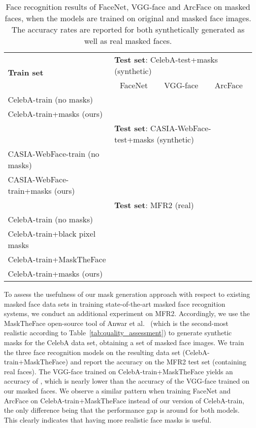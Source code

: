 \documentclass{article}
\begin{document}
\begin{table}
\begin{center}
\setlength\tabcolsep{4.5pt}
\begin{tabular}{|l|c|c|c|}
    \hline
    \multirow{2}{*}{\bf Train set} & \multicolumn{3}{|l|}{{\bf Test set}: CelebA-test+masks (synthetic)} \\
\cline{2-4}
    & FaceNet & VGG-face & ArcFace\\
    \hline
    \hline
    CelebA-train (no masks) &  &  & \\
    \hline
    CelebA-train+masks (ours)  &  &  & \\
    \hline
     & \multicolumn{3}{|l|}{{\bf Test set}: CASIA-WebFace-test+masks (synthetic)} \\
     \hline
    CASIA-WebFace-train (no masks) &  &  & \\
    \hline
    CASIA-WebFace-train+masks (ours)  &  &  & \\
    \hline
    & \multicolumn{3}{|l|}{{\bf Test set}: MFR2 (real)} \\
     \hline
     CelebA-train (no masks) &  &  & \\
     \hline
    CelebA-train+black pixel masks  &  &  & \\
    \hline
    CelebA-train+MaskTheFace \cite{anwar2020arxiv}  &  &  & \\
    \hline
    CelebA-train+masks (ours)  &  &  & \\
    \hline
\end{tabular}
\end{center}
\caption{Face recognition results of FaceNet, VGG-face and ArcFace on masked faces, when the models are trained on original and masked face images. The accuracy rates are reported for both synthetically generated as well as real masked faces.} 
\label{tab:quantitative-results}
\end{table} 






To assess the usefulness of our mask generation approach with respect to existing masked face data sets in training state-of-the-art masked face recognition systems, we conduct an additional experiment on MFR2. Accordingly, we use the MaskTheFace open-source tool of Anwar et al.~\cite{anwar2020arxiv} (which is the second-most realistic according to Table~\ref{tab:quality_assessment}) to generate synthetic masks for the CelebA data set, obtaining a set of  masked face images. We train the three face recognition models on the resulting data set (CelebA-train+MaskTheFace) and report the accuracy on the MFR2 test set (containing real faces). The VGG-face trained on CelebA-train+MaskTheFace yields an accuracy of , which is nearly  lower than the accuracy of the VGG-face trained on our masked faces. We observe a similar pattern when training FaceNet and ArcFace on CelebA-train+MaskTheFace instead of our version of CelebA-train, the only difference being that the performance gap is around  for both models. This clearly indicates that having more realistic face masks is useful.
\end{document}
